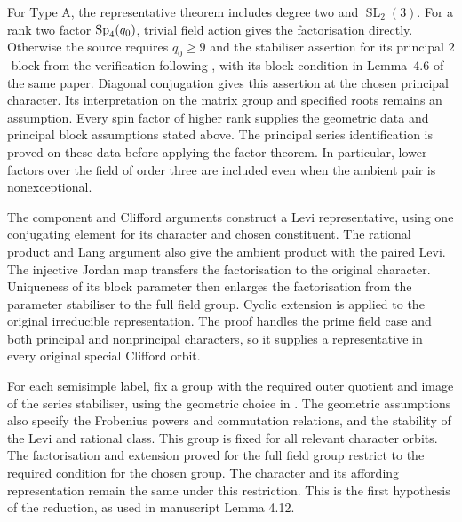 For Type A, the representative theorem
\cite[Theorem~8.1]{FengLiZhang2021Equivariant} includes degree two and
$\operatorname{SL}_2(3)$. For a rank two factor $\operatorname{Sp}_4(q_0)$, trivial
field action gives the factorisation directly. Otherwise the source
requires $q_0\geq9$ and the stabiliser assertion for its principal
$2$-block from the verification following
\cite[Lemma~4.5, p.~1203]{BroughSchaefferFry2020}, with its block condition
in Lemma~4.6 of the same paper. Diagonal conjugation gives this assertion
at the chosen principal character. Its interpretation on the matrix
group and specified roots remains an assumption. Every spin factor of
higher rank supplies the geometric data and principal block assumptions
stated above. The principal series identification is proved on these
data before applying the factor theorem.
In particular, lower factors over the field of order three are
included even when the ambient pair is nonexceptional.

The component and Clifford arguments construct a Levi
representative, using one conjugating element for its character
and chosen constituent. The rational product and Lang argument
also give the ambient product with the paired Levi. The injective
Jordan map transfers the factorisation to the original character.
Uniqueness of its block parameter then enlarges the
factorisation from the parameter stabiliser to the full field
group. Cyclic extension is applied to the original irreducible
representation. The proof handles the prime field case and both
principal and nonprincipal characters, so it supplies a
representative in every original special Clifford orbit.

For each semisimple label, fix a group with the required outer quotient
and image of the series stabiliser, using the geometric choice in
\cite[Corollary~4.2]{Ruhstorfer2022Derived}. The geometric assumptions also specify
the Frobenius powers and commutation relations, and the stability of the
Levi and rational class. This group is fixed for all relevant character
orbits. The factorisation and extension proved for
the full field group restrict to the required condition for the chosen
group. The character and its affording representation remain the
same under this restriction. This is the first hypothesis of the
reduction, as used in manuscript Lemma 4.12.

